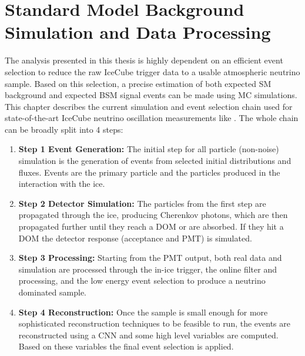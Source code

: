 \setchapterpreamble[u]{\margintoc}


\chapter{Standard Model Background Simulation and Data Processing}

The analysis presented in this thesis is highly dependent on an efficient event selection to reduce the raw IceCube trigger data to a usable atmospheric neutrino sample. Based on this selection, a precise estimation of both expected SM background and expected BSM signal events can be made using MC simulations. This chapter describes the current simulation and event selection chain used for state-of-the-art IceCube neutrino oscillation measurements like . The whole chain can be broadly split into 4 steps:

\begin{enumerate}[wide]
    
    \item[]{\textbf{Step 1 Event Generation:}} The initial step for all particle (non-noise) simulation is the generation of events from selected initial distributions and fluxes. Events are the primary particle and the particles produced in the interaction with the ice.
    \vspace{0.2cm} 

    \item[]{\textbf{Step 2 Detector Simulation:}} The particles from the first step are propagated through the ice, producing Cherenkov photons, which are then propagated further until they reach a DOM or are absorbed. If they hit a DOM the detector response (acceptance and PMT) is simulated.
    \vspace{0.2cm} 
        
    \item[]{\textbf{Step 3 Processing:}} Starting from the PMT output, both real data and simulation are processed through the in-ice trigger, the online filter and processing, and the low energy event selection to produce a neutrino dominated sample.
    \vspace{0.2cm} 

    \item[]{\textbf{Step 4 Reconstruction:}} Once the sample is small enough for more sophisticated reconstruction techniques to be feasible to run, the events are reconstructed using a CNN and some high level variables are computed. Based on these variables the final event selection is applied.
    
\end{enumerate}

